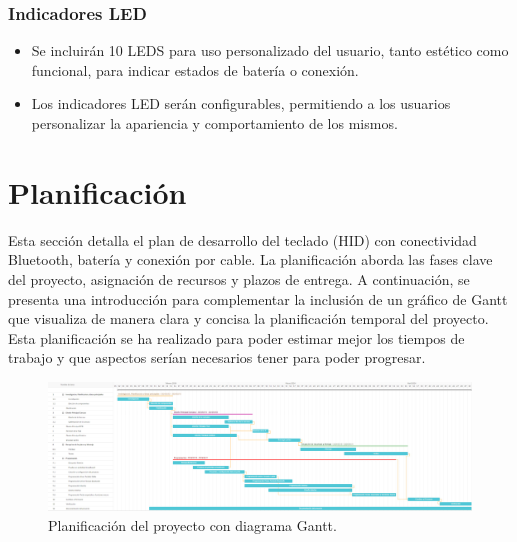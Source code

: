 \subsubsection{Indicadores \gls{LED}}
\begin{itemize}
\item Se incluirán 10 \gls{LED}S para uso personalizado del usuario, tanto estético como funcional, para indicar estados de batería o conexión.
\item Los indicadores \gls{LED} serán configurables, permitiendo a los usuarios personalizar la apariencia y comportamiento de los mismos.
\end{itemize}

\section{Planificación}

Esta sección detalla el plan de desarrollo del teclado (\gls{HID}) con conectividad \gls{Bluetooth}, batería y conexión por cable. La planificación aborda las fases clave del proyecto, asignación de recursos y plazos de entrega. A continuación, se presenta una introducción para complementar la inclusión de un gráfico de Gantt que visualiza de manera clara y concisa la planificación temporal del proyecto. Esta planificación se ha realizado para poder estimar mejor los tiempos de trabajo y que aspectos serían necesarios tener para poder progresar.

\begin{figure}
\centering
\includegraphics[width=\textheight]{imagenes/Capitulos/Cap02/DiagramaGantt.png}
\caption{Planificación del proyecto con diagrama Gantt.}
\label{fig:Diagrama}
\end{figure}

